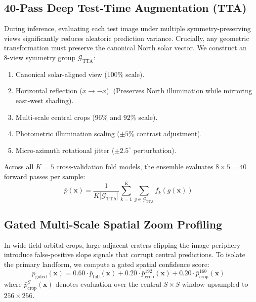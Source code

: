 \documentclass[10pt,journal,compsoc]{IEEEtran}
\theoremstyle{definition}
\begin{document}
\subsection{40-Pass Deep Test-Time Augmentation (TTA)}
During inference, evaluating each test image under multiple symmetry-preserving views significantly reduces aleatoric prediction variance. Crucially, any geometric transformation must preserve the canonical North solar vector. We construct an 8-view symmetry group $\mathcal{G}_{\text{TTA}}$:
\begin{enumerate}
    \item Canonical solar-aligned view ($100\%$ scale).
    \item Horizontal reflection ($x \to -x$). (Preserves North illumination while mirroring east-west shading).
    \item Multi-scale central crops ($96\%$ and $92\%$ scale).
    \item Photometric illumination scaling ($\pm 5\%$ contrast adjustment).
    \item Micro-azimuth rotational jitter ($\pm 2.5^\circ$ perturbation).
\end{enumerate}
Across all $K=5$ cross-validation fold models, the ensemble evaluates $8 \times 5 = 40$ forward passes per sample:
\begin{equation}
\bar{p}(\mathbf{x}) = \frac{1}{K |\mathcal{G}_{\text{TTA}}|} \sum_{k=1}^K \sum_{g \in \mathcal{G}_{\text{TTA}}} f_k(g(\mathbf{x}))
\end{equation}

\subsection{Gated Multi-Scale Spatial Zoom Profiling}
In wide-field orbital crops, large adjacent craters clipping the image periphery introduce false-positive slope signals that corrupt central predictions. To isolate the primary landform, we compute a gated spatial confidence score:
\begin{equation}
p_{\text{gated}}(\mathbf{x}) = 0.60 \cdot \bar{p}_{\text{full}}(\mathbf{x}) + 0.20 \cdot \bar{p}_{\text{crop}}^{192}(\mathbf{x}) + 0.20 \cdot \bar{p}_{\text{crop}}^{160}(\mathbf{x})
\end{equation}
where $\bar{p}_{\text{crop}}^S(\mathbf{x})$ denotes evaluation over the central $S \times S$ window upsampled to $256 \times 256$.
\end{document}
